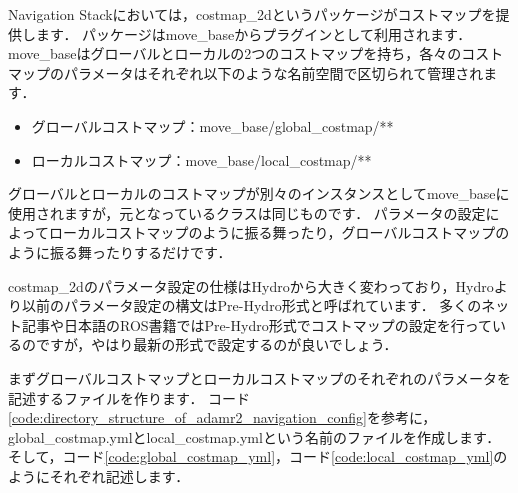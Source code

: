 \documentclass[{../../master}]{subfiles}
\begin{document}
Navigation Stackにおいては，\textsf{costmap\_2d}というパッケージがコストマップを提供します．
パッケージは\textsf{move\_base}からプラグインとして利用されます．
\textsf{move\_base}はグローバルとローカルの2つのコストマップを持ち，各々のコストマップのパラメータはそれぞれ以下のような名前空間で区切られて管理されます．

\begin{itemize}
  \item グローバルコストマップ：\textsf{move\_base/global\_costmap/**}
  \item ローカルコストマップ：\textsf{move\_base/local\_costmap/**}
\end{itemize}

グローバルとローカルのコストマップが別々のインスタンスとして\textsf{move\_base}に使用されますが，元となっているクラスは同じものです．
パラメータの設定によってローカルコストマップのように振る舞ったり，グローバルコストマップのように振る舞ったりするだけです．\cite{costmap_2d_configuration}

\textsf{costmap\_2d}のパラメータ設定の仕様はHydroから大きく変わっており，Hydroより以前のパラメータ設定の構文はPre-Hydro形式と呼ばれています．
多くのネット記事や日本語のROS書籍ではPre-Hydro形式でコストマップの設定を行っているのですが，やはり最新の形式で設定するのが良いでしょう．

まずグローバルコストマップとローカルコストマップのそれぞれのパラメータを記述するファイルを作ります．
コード\ref{code:directory_structure_of_adamr2_navigation_config}を参考に，\textsf{global\_costmap.yml}と\textsf{local\_costmap.yml}という名前のファイルを作成します．
そして，コード\ref{code:global_costmap_yml}，コード\ref{code:local_costmap_yml}のようにそれぞれ記述します．
\end{document}
